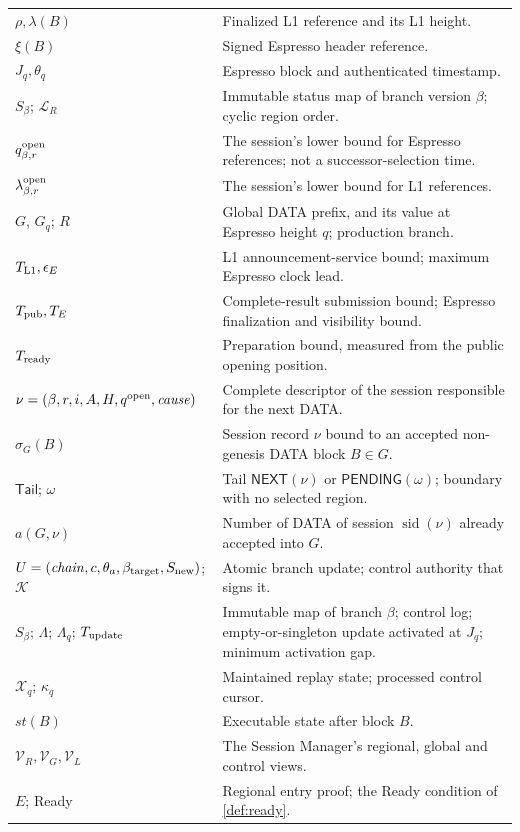 \documentclass[11pt,a4paper]{article}
\newcommand{\tagg}[1]{\ensuremath{\mathsf{#1}}}
\begin{document}
\begin{table}[htbp]
\begin{tabularx}{\linewidth}{@{}p{.32\linewidth}Y@{}}
$\rho,\lambda(B)$ & Finalized L1 reference and its L1 height.\\
$\xi(B)$ & Signed Espresso header reference.\\
$J_q,\theta_q$ & Espresso block and authenticated timestamp.\\
$S_\beta$; $\mathcal L_R$ & Immutable status map of branch version $\beta$; cyclic region order.\\
$q_{\beta,r}^{\rm open}$ & The session's lower bound for Espresso references; not a successor-selection time.\\
$\lambda_{\beta,r}^{\rm open}$ & The session's lower bound for L1 references.\\
$G$, $G_q$; $R$ & Global DATA prefix, and its value at Espresso height $q$; production branch.\\
$T_{\rm L1},\epsilon_E$ & L1 announcement-service bound; maximum Espresso clock lead.\\
$T_{\rm pub},T_E$ & Complete-result submission bound; Espresso finalization and visibility bound.\\
$T_{\rm ready}$ & Preparation bound, measured from the public opening position.\\
$\nu=(\beta,r,i,A,H,q^{\rm open},\mathit{cause})$ & Complete descriptor of the session responsible for the next DATA.\\
$\sigma_G(B)$ & Session record $\nu$ bound to an accepted non-genesis DATA block $B\in G$.\\
$\mathsf{Tail}$; $\omega$ & Tail $\tagg{NEXT}(\nu)$ or $\tagg{PENDING}(\omega)$; boundary with no selected region.\\
$a(G,\nu)$ & Number of DATA of session $\operatorname{sid}(\nu)$ already accepted into $G$.\\
$U=(\mathit{chain},c,\theta_a,\beta_{\rm target},S_{\rm new})$; $\mathcal K$ & Atomic branch update; control authority that signs it.\\
$S_\beta$; $\Lambda$; $\Lambda_q$; $T_{\rm update}$ & Immutable map of branch $\beta$; control log; empty-or-singleton update activated at $J_q$; minimum activation gap.\\
$\mathcal X_q$; $\kappa_q$ & Maintained replay state; processed control cursor.\\
$\mathit{st}(B)$ & Executable state after block $B$.\\
$\mathcal V_R,\mathcal V_G,\mathcal V_L$ & The Session Manager's regional, global and control views.\\
$E$; Ready & Regional entry proof; the Ready condition of \cref{def:ready}.\\
\bottomrule\end{tabularx}
\end{table}
\end{document}
